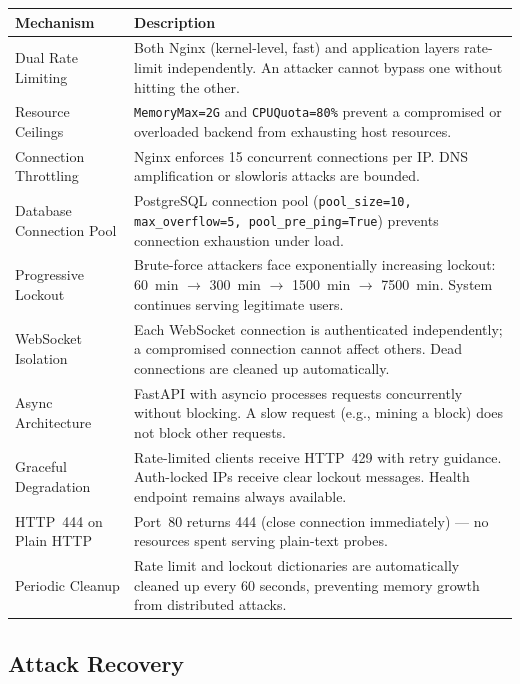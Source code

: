 \documentclass[12pt,a4paper]{article}
\begin{document}
\begin{center}
\small
\begin{tabularx}{\textwidth}{lX}
\toprule
\textbf{Mechanism} & \textbf{Description} \\
\midrule
Dual Rate Limiting & Both Nginx (kernel-level, fast) and application layers rate-limit independently. An attacker cannot bypass one without hitting the other. \\
Resource Ceilings & \texttt{MemoryMax=2G} and \texttt{CPUQuota=80\%} prevent a compromised or overloaded backend from exhausting host resources. \\
Connection Throttling & Nginx enforces 15 concurrent connections per IP. DNS amplification or slowloris attacks are bounded. \\
Database Connection Pool & PostgreSQL connection pool (\texttt{pool\_size=10, max\_overflow=5, pool\_pre\_ping=True}) prevents connection exhaustion under load. \\
Progressive Lockout & Brute-force attackers face exponentially increasing lockout: 60~min $\rightarrow$ 300~min $\rightarrow$ 1500~min $\rightarrow$ 7500~min. System continues serving legitimate users. \\
WebSocket Isolation & Each WebSocket connection is authenticated independently; a compromised connection cannot affect others. Dead connections are cleaned up automatically. \\
Async Architecture & FastAPI with asyncio processes requests concurrently without blocking. A slow request (e.g., mining a block) does not block other requests. \\
Graceful Degradation & Rate-limited clients receive HTTP~429 with retry guidance. Auth-locked IPs receive clear lockout messages. Health endpoint remains always available. \\
HTTP~444 on Plain HTTP & Port~80 returns 444 (close connection immediately) — no resources spent serving plain-text probes. \\
Periodic Cleanup & Rate limit and lockout dictionaries are automatically cleaned up every 60 seconds, preventing memory growth from distributed attacks. \\
\bottomrule
\end{tabularx}
\end{center}

\subsection{Attack Recovery}
\end{document}
